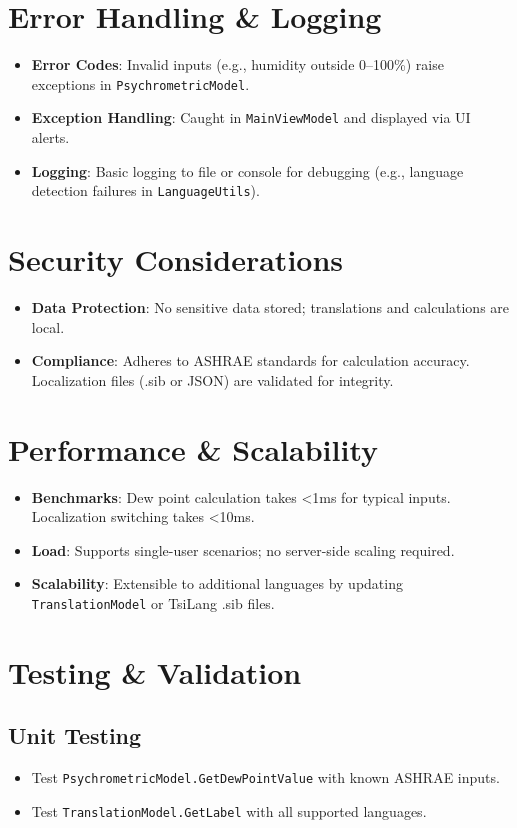 \documentclass[12pt,a4paper]{article}
\begin{document}
	\section{Error Handling \& Logging}
	\begin{itemize}
		\item \textbf{Error Codes}: Invalid inputs (e.g., humidity outside 0–100\%) raise exceptions in \texttt{PsychrometricModel}.
		\item \textbf{Exception Handling}: Caught in \texttt{MainViewModel} and displayed via UI alerts.
		\item \textbf{Logging}: Basic logging to file or console for debugging (e.g., language detection failures in \texttt{LanguageUtils}).
	\end{itemize}
	
	\section{Security Considerations}
	\begin{itemize}
		\item \textbf{Data Protection}: No sensitive data stored; translations and calculations are local.
		\item \textbf{Compliance}: Adheres to ASHRAE standards for calculation accuracy. Localization files (.sib or JSON) are validated for integrity.
	\end{itemize}
	
	\section{Performance \& Scalability}
	\begin{itemize}
		\item \textbf{Benchmarks}: Dew point calculation takes <1ms for typical inputs. Localization switching takes <10ms.
		\item \textbf{Load}: Supports single-user scenarios; no server-side scaling required.
		\item \textbf{Scalability}: Extensible to additional languages by updating \texttt{TranslationModel} or TsiLang .sib files.
	\end{itemize}
	
	\section{Testing \& Validation}
	\subsection{Unit Testing}
	\begin{itemize}
		\item Test \texttt{PsychrometricModel.GetDewPointValue} with known ASHRAE inputs.
		\item Test \texttt{TranslationModel.GetLabel} with all supported languages.
	\end{itemize}
\end{document}
